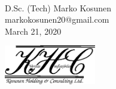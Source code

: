 \vspace*{7cm}
 \\

\vspace*{2cm}
\noindent D.Sc. (Tech) Marko Kosunen\\
markokosunen20@gmail.com\\
March 21, 2020
\vfill

\includegraphics[width=4cm]{Figures/KHClogo.eps}
\newpage
{}
\newpage

